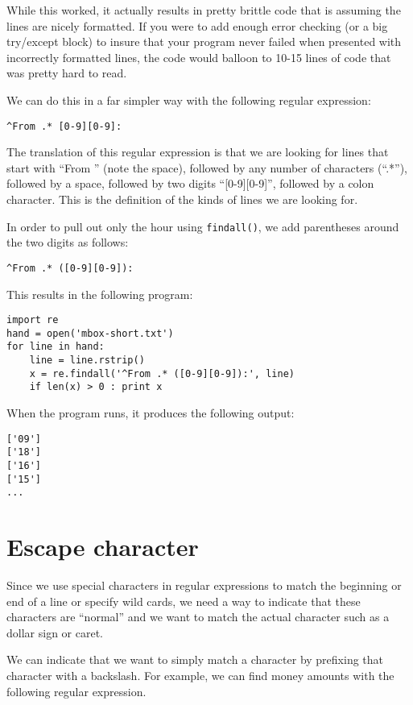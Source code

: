While this worked, it actually results in pretty brittle code that is assuming the lines are nicely
formatted.  If you were to add enough error checking (or a big try/except block) to insure that your
program never failed when presented with incorrectly formatted lines, the code would balloon to 
10-15 lines of code that was pretty hard to read.

We can do this in a far simpler way with the following regular expression:

\beforeverb
\begin{verbatim}
^From .* [0-9][0-9]:
\end{verbatim}
\afterverb
%
The translation of this regular expression is that we are looking for lines that start with ``From ''
(note the space), followed by any number of characters (``.*''), followed by a space, followed by two
digits ``[0-9][0-9]'', followed by a colon character.  This is the definition of the kinds of lines
we are looking for.  

In order to pull out only the hour using {\tt findall()}, we add parentheses around the two digits
as follows:

\beforeverb
\begin{verbatim}
^From .* ([0-9][0-9]):
\end{verbatim}
\afterverb
%
This results in the following program:

\beforeverb
\begin{verbatim}
import re
hand = open('mbox-short.txt')
for line in hand:
    line = line.rstrip()
    x = re.findall('^From .* ([0-9][0-9]):', line)
    if len(x) > 0 : print x
\end{verbatim}
\afterverb
%
When the program runs, it produces the following output:

\beforeverb
\begin{verbatim}
['09']
['18']
['16']
['15']
...
\end{verbatim}
\afterverb
%
\section{Escape character}

Since we use special characters in regular expressions to match the beginning or end of 
a line or specify wild cards, we need a way to indicate that these characters are ``normal'' 
and we want to match the actual character such as a dollar sign or caret.

We can indicate that we want to simply match a character by prefixing that character 
with a backslash.  For example, we can find money amounts with the following regular
expression.

